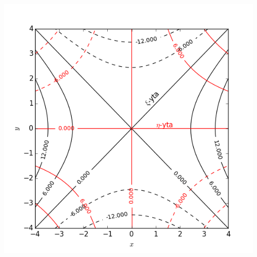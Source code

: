 \documentclass[%
oneside,                 %
final,                   %
10pt]{article}
\newenvironment{notice_mdfboxadmon}[1][]{
\begin{notice_mdfboxmdframed}[frametitle=#1]
}
{
\end{notice_mdfboxmdframed}
}
\begin{document}
\begin{notice_mdfboxadmon}
\vspace{6mm}

\centerline{\includegraphics[width=0.8\linewidth]{fig/koordinatytor.png}}

\vspace{6mm}
\end{notice_mdfboxadmon} %
\end{document}
